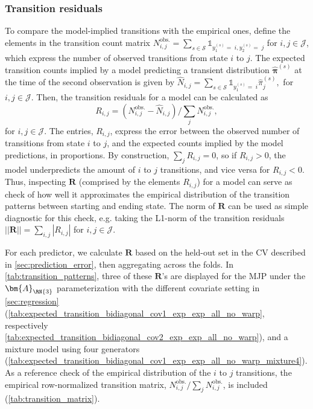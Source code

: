 \subsubsection{Transition residuals} \label{sec:transition_patterns}

To compare the model-implied transitions with the empirical ones, define the elements in the transition count matrix
$
  N_{i,j}^{\text{obs.}} = \sum_{s \in \mathcal S} \mathds{1}_{y_1^{(s)} =\; i, y_2^{(s)} =\; j}
$ for $i,j \in \mathcal J$, which express the number of observed transitions from state $i$ to $j$. The expected transition counts implied by a model predicting a transient distribution $\widehat{\bm \pi}^{(s)}$ at the time of the second observation is given by
$
\widehat{  N}_{i,j} =  \sum_{s \in \mathcal S} \mathds{1}_{y_1^{(s)} = \; i} \widehat{ \pi}_j^{(s)},
$ for $i,j \in \mathcal J$.
Then, the transition residuals for a model can be calculated as
$$
  R_{i,j} = \left(  N_{i,j}^{\text{obs.}} - \widehat{  N}_{i,j} \right) / \sum_{j}   N_{i,j}^{\text{obs.}},
$$ for $i,j \in \mathcal J$.
The entries, $  R_{i,j}$, express the error between the observed number of transitions from state $i$ to $j$, and the expected counts implied by the model predictions, in proportions. 
By construction, $\sum_{j}   R_{i,j} = 0$, so if $  R_{i,j} > 0$, the model underpredicts the amount of $i$ to $j$ transitions, and vice versa for $  R_{i,j} < 0$.
Thus, inspecting $\bm R$ (comprised by the elements $R_{i,j}$) for a model can serve as check of how well it approximates the empirical distribution of the transition patterns between starting and ending state. The norm of $\bm R$ can be used as simple diagnostic for this check, e.g. taking the L1-norm of the transition residuals
$
|| \bm R || = \sum_{i,j} |  R_{i,j}|
$ for $i,j \in \mathcal J$.

For each predictor, we calculate $\bm R$ based on the held-out set in the CV described in \cref{sec:prediction_error}, then aggregating across the folds. In \cref{tab:transition_patterns}, three of these $\bm R$'s are displayed for the MJP under the $\bm{A}_{\RN{3}}$ parameterization with the different covariate setting in \cref{sec:regression} (\cref{tab:expected_transition_bidiagonal_cov1_exp_exp_all_no_warp}, respectively \cref{tab:expected_transition_bidiagonal_cov2_exp_exp_all_no_warp}), and a mixture model using four generators (\cref{tab:expected_transition_bidiagonal_cov1_exp_exp_all_no_warp_mixture4}). As a reference check of the empirical distribution of the $i$ to $j$ transitions, the empirical row-normalized transition matrix, $ N_{i,j}^{\text{obs.}} / \sum_{j}  N_{i,j}^{\text{obs.}}$, is included (\cref{tab:transition_matrix}).

